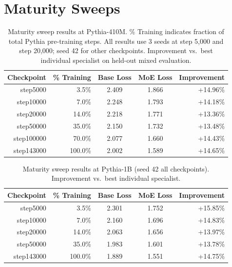 \documentclass{article}
\begin{document}
\section{Maturity Sweeps}
\label{app:maturity}

\begin{table}[h]
\centering
\caption{Maturity sweep results at Pythia-410M. \% Training indicates fraction of total Pythia pre-training steps. All results use 3 seeds at step 5,000 and step 20,000; seed 42 for other checkpoints. Improvement vs.\ best individual specialist on held-out mixed evaluation.}
\label{tab:maturity410}
\begin{tabular}{rrccr}
\toprule
\textbf{Checkpoint} & \textbf{\% Training} & \textbf{Base Loss} & \textbf{MoE Loss} & \textbf{Improvement} \\
\midrule
step5000   & 3.5\%   & 2.409 & 1.866 & +14.96\% \\
step10000  & 7.0\%   & 2.248 & 1.793 & +14.18\% \\
step20000  & 14.0\%  & 2.218 & 1.771 & +13.36\% \\
step50000  & 35.0\%  & 2.150 & 1.732 & +13.48\% \\
step100000 & 70.0\%  & 2.077 & 1.660 & +14.43\% \\
step143000 & 100.0\% & 2.002 & 1.589 & +14.65\% \\
\bottomrule
\end{tabular}
\end{table}

\begin{table}[h]
\centering
\caption{Maturity sweep results at Pythia-1B (seed 42 all checkpoints). Improvement vs.\ best individual specialist.}
\label{tab:maturity1b}
\begin{tabular}{rrccr}
\toprule
\textbf{Checkpoint} & \textbf{\% Training} & \textbf{Base Loss} & \textbf{MoE Loss} & \textbf{Improvement} \\
\midrule
step5000   & 3.5\%   & 2.301 & 1.752 & +15.85\% \\
step10000  & 7.0\%   & 2.160 & 1.696 & +14.83\% \\
step20000  & 14.0\%  & 2.063 & 1.656 & +13.97\% \\
step50000  & 35.0\%  & 1.983 & 1.601 & +13.78\% \\
step143000 & 100.0\% & 1.889 & 1.551 & +14.75\% \\
\bottomrule
\end{tabular}
\end{table}
\end{document}
